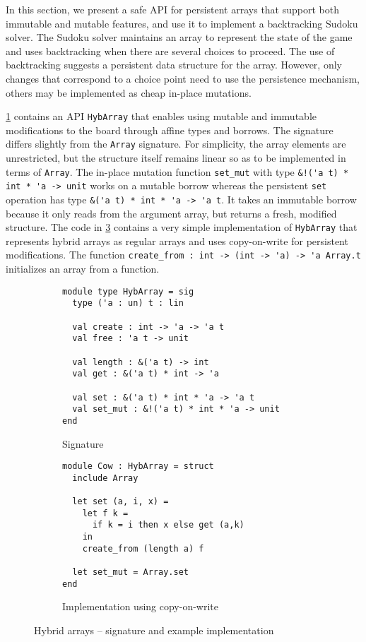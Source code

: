 In this section, we present
a safe API for persistent arrays that support both immutable and mutable features,
and use it to implement a backtracking Sudoku solver.
The Sudoku solver maintains an array to represent the state of
the game and uses backtracking when there are several choices to proceed.
The use of backtracking suggests a persistent data structure for the array.
However, only changes that correspond to a choice point need to use
the persistence mechanism, others may be implemented as
cheap in-place mutations.

\cref{sig:hybarray} contains an API \lstinline/HybArray/ 
that enables using mutable and immutable modifications to
the board through affine types and borrows.
The signature differs slightly from the \lstinline/Array/
signature. For simplicity, the array elements are unrestricted, but
the structure itself remains linear so as to be implemented in terms of \lstinline/Array/.
The in-place mutation function \lstinline/set_mut/ with type
\lstinline/&!('a t) * int * 'a -> unit/ works on a mutable borrow  whereas the persistent
\lstinline/set/ operation has type \lstinline/&('a t) * int * 'a -> 'a t/. It
takes an immutable borrow because it only reads from the
argument array, but returns a fresh,  modified structure.
The code in \cref{ex:cow} contains a very simple implementation of
\lstinline/HybArray/ that represents hybrid arrays
as regular arrays and uses copy-on-write for persistent
modifications. The function
\lstinline/create_from : int -> (int -> 'a) -> 'a Array.t /
initializes an array from a function.


\begin{figure}[tp]
  \centering
  \begin{subfigure}{0.48\linewidth}
\begin{lstlisting}
module type HybArray = sig
  type ('a : un) t : lin
  
  val create : int -> 'a -> 'a t
  val free : 'a t -> unit

  val length : &('a t) -> int
  val get : &('a t) * int -> 'a

  val set : &('a t) * int * 'a -> 'a t
  val set_mut : &!('a t) * int * 'a -> unit
end
\end{lstlisting}
    \caption{Signature}
    \label{sig:hybarray}
  \end{subfigure}\hfill
  \begin{subfigure}{0.5\linewidth}
\begin{lstlisting}
module Cow : HybArray = struct
  include Array

  let set (a, i, x) =
    let f k =
      if k = i then x else get (a,k)
    in
    create_from (length a) f
  
  let set_mut = Array.set
end
\end{lstlisting}
    \caption{Implementation using copy-on-write}
    \label{ex:cow}
  \end{subfigure}
  \caption{Hybrid arrays -- signature and example implementation}
\end{figure}


